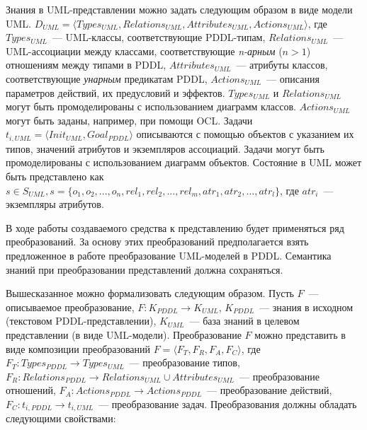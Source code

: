     Знания в UML-представлении можно задать следующим образом в виде модели UML.
  $D_{UML} = \langle Types_{UML}, Relations_{UML}, Attributes_{UML}, Actions_{UML} \rangle$, где $Types_{UML}$~--- UML-классы, соответствующие PDDL-типам, $Relations_{UML}$~--- UML-ассоциации между классами, соответствующие \textit{n-арным} ($n > 1$) отношениям между типами в PDDL, $Attributes_{UML}$~--- атрибуты классов, соответствующие \textit{унарным} предикатам PDDL, $Actions_{UML}$~--- описания параметров действий, их предусловий и эффектов.
 $Types_{UML}$ и $Relations_{UML}$ могут быть промоделированы с использованием диаграмм классов.
 $Actions_{UML}$ могут быть заданы, например, при помощи OCL.
 Задачи  $t_{i, UML} = \langle Init_{UML}, Goal_{PDDL} \rangle$ описываются с помощью объектов с указанием их типов, значений атрибутов и экземпляров ассоциаций.
 Задачи могут быть промоделированы с использованием диаграмм объектов.
 Состояние в UML может быть представлено как $ s \in S_{UML}, s = \{o_1, o_2, ..., o_n, rel_1, rel_2, ..., rel_m, atr_1, atr_2, ..., atr_l\}$, где $atr_i$~--- экземпляры атрибутов.
    
    В ходе работы создаваемого средства к представлению будет применяться ряд преобразований.
  За основу этих преобразований предполагается взять предложенное в работе \cite{mal-manz} преобразование UML-моделей в PDDL.
 Семантика знаний при преобразовании представлений должна сохраняться.
     
    Вышесказанное можно формализовать следующим образом.
 Пусть $F$~--- описываемое преобразование, $F: K_{PDDL} \to K_{UML}$, $K_{PDDL}$~--- знания в исходном (текстовом PDDL-представлении), $K_{UML}$~--- база знаний в целевом представлении (в виде UML-модели).
 Преобразование $F$ можно представить в виде композиции преобразований $F = \langle F_T, F_R, F_A, F_C \rangle$, где $F_T: Types_{PDDL} \rightarrow Types_{UML}$~--- преобразование типов, $F_R: Relations_{PDDL} \rightarrow Relations_{UML} \cup Attributes_{UML}$~--- преобразование отношений, $F_A: Actions_{PDDL} \rightarrow Actions_{PDDL}$~--- преобразование действий, $F_C: t_{i, PDDL} \rightarrow t_{i, UML}$~--- преобразование задач.
 Преобразования должны обладать следующими свойствами:
    
